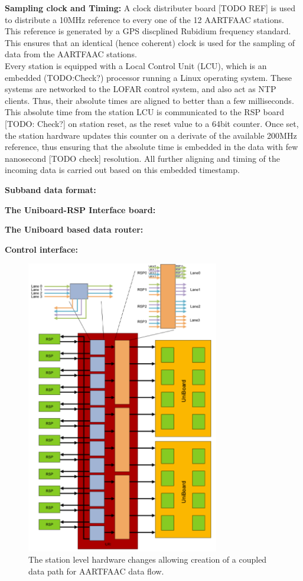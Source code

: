 \documentclass{aa}
\begin{document}
\textbf {Sampling  clock and Timing:}  A clock  distributer board [TODO  REF] is
used  to  distribute  a  10MHz  reference  to  every  one  of  the  12  AARTFAAC
stations. This  reference is  generated by a  GPS discplined  Rubidium frequency
standard. This ensures that an identical  (hence coherent) clock is used for the
sampling of data from the AARTFAAC stations.\\

Every station is equipped with a Local  Control Unit (LCU), which is an embedded
(TODO:Check?)  processor  running a Linux  operating system.  These  systems are
networked to the LOFAR control system, and  also act as NTP clients. Thus, their
absolute times are aligned to better than a few milliseconds. This absolute time
from the station LCU is communicated to  the RSP board [TODO: Check?] on station
reset, as the  reset value to a  64bit counter.  Once set,  the station hardware
updates  this counter  on a  derivate of  the available  200MHz reference,  thus
ensuring that  the absolute  time is  embedded in the  data with  few nanosecond
[TODO check] resolution. All further aligning and timing of the incoming data is
carried out based on this embedded timestamp.

\textbf {Subband data format:}

\textbf {The Uniboard-RSP Interface board:}

\textbf {The Uniboard based data router:}

\textbf {Control interface:}

\begin{figure}[htbp]
\centering
\includegraphics[width=0.75\textwidth]{Figs/station_hw_proc_afaac.png}
\caption{The station level hardware changes  allowing creation of a coupled data
  path for AARTFAAC data flow.}
\label{fig:afaac_station_hw}
\end{figure}
\end{document}
